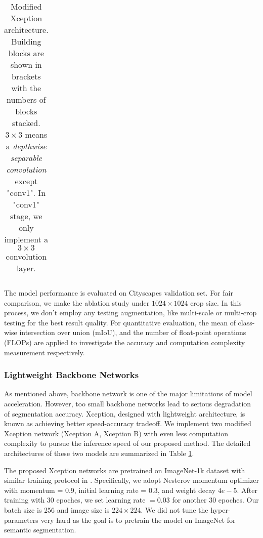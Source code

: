 \documentclass[10pt,twocolumn,letterpaper]{article}
\begin{document}
\begin{table}
\begin{center}
\begin{tabular}{l|c|c}
\hline
\end{tabular}
\end{center}
\caption{Modified Xception architecture. Building blocks are shown in brackets with the numbers of blocks stacked. $3\times3$ means a \textit{depthwise separable convolution} except "conv1". In "conv1" stage, we only implement a $3\times3$ convolution layer.
}
\label{tab:backbone-struct}
\end{table}

The model performance is evaluated on Cityscapes validation set. For fair comparison, we make the ablation study under $1024\times1024$ crop size. In this process, we don't employ any testing augmentation, like multi-scale or multi-crop testing for the best result quality. For quantitative evaluation, the mean of class-wise intersection over union (mIoU), and the number of float-point operations (FLOPs) are applied to investigate the accuracy and computation complexity measurement respectively. 

\subsubsection{Lightweight Backbone Networks}
As mentioned above, backbone network is one of the major limitations of model acceleration. However, too small backbone networks lead to serious degradation of segmentation accuracy. Xception, designed with lightweight architecture, is known as achieving better speed-accuracy tradeoff. We implement two modified Xception network (Xception A, Xception B) with even less computation complexity to pursue the inference speed  of our proposed method. The detailed architectures of these two models are summarized in Table \ref{tab:backbone-struct}. 


The proposed Xception networks are pretrained on ImageNet-1k dataset with similar training protocol in \cite{imagenet}\cite{deeplabv3plus}. Specifically, we adopt Nesterov momentum optimizer with momentum = 0.9, initial learning rate = 0.3, and weight decay $4e-5$. After training with 30 epoches, we set learning rate $= 0.03$ for another 30 epoches. Our batch size is 256 and image size is $224 \times 224$. We did not tune the hyper-parameters very hard as the goal is to pretrain the model on ImageNet for semantic segmentation. 
\end{document}
